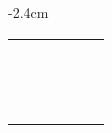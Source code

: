 \begin{center}
\begin{adjustwidth}{-2.4cm}{}
\begin{tabular}{|c c c c c c|}
             &  &  &  &  &  \\
             &  &  &  &  &  \\
             &  &  &  &  &  \\
             &  &  &  &  &  \\
             &  &  &  &  &  \\
             &  &  &  &  &  \\
             &  &  &  &  &  \\
             &  &  &  &  &  \\
             &  &  &  &  &  \\
             &  &  &  &  &  \\
             &  &  &  &  &  \\
             &  &  &  &  &  \\
             &  &  &  &  &  \\
             &  &  &  &  &  \\
            \hline
        \end{tabular}
    \end{adjustwidth}
\end{center}

